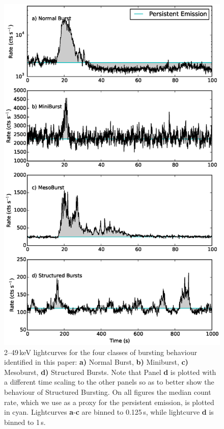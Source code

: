 \begin{figure}
  \centering
  \includegraphics[width=.9\linewidth, trim={0.7cm 0.1cm 1.5cm 1.4cm},clip]{images/comp_bursts.eps}
  \caption{\small 2--49\,keV lightcurves for the four classes of bursting behaviour identified in this paper: \textbf{a)} Normal Burst, \textbf{b)} Miniburst, \textbf{c)} Mesoburst, \textbf{d)} Structured Bursts.  Note that Panel \textbf{d} is plotted with a different time scaling to the other panels so as to better show the behaviour of Structured Bursting.  On all figures the median count rate, which we use as a proxy for the persistent emission, is plotted in cyan.  Lightcurves \textbf{a}-\textbf{c} are binned to 0.125\,s, while lightcurve \textbf{d} is binned to 1\,s.}
  \label{fig:classes}
\end{figure}

